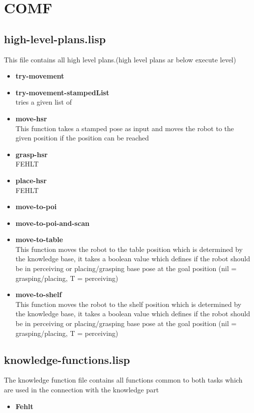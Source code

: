\documentclass[main.tex]{subfiles}
\begin{document}
	  	\section{COMF}
	    \subsection{high-level-plans.lisp}
	    This file contains all high level plans.(high level plans ar below execute level)
	    \begin{itemize}
	    \item \textbf{try-movement} \\
	    
		\item \textbf{try-movement-stampedList} \\
		tries a given list of
	    \item \textbf{move-hsr} \\
	    This function takes a stamped pose as input and moves the robot to the given position if the position can be reached
	    \item \textbf{grasp-hsr} \\
	    FEHLT
	    \item \textbf{place-hsr} \\
	    FEHLT
	    \item \textbf{move-to-poi} \\
	    \item \textbf{move-to-poi-and-scan} \\
	    \item \textbf{move-to-table} \\
	    This function moves the robot to the table position which is determined by the knowledge base, it takes a boolean value which defines if the robot should be in perceiving or placing/grasping base pose at the goal position (nil = grasping/placing, T = perceiving) 
	    \item \textbf{move-to-shelf} \\
	    This function moves the robot to the shelf position which is determined by the knowledge base, it takes a boolean value which defines if the robot should be in perceiving or placing/grasping base pose at the goal position (nil = grasping/placing, T = perceiving) 
		\end{itemize}
	    \subsection{knowledge-functions.lisp}
	    The knowledge function file contains all functions common to both tasks which are used in the connection with the knowledge part
	    \begin{itemize}
	    	\item \textbf{Fehlt} \\
	    \end{itemize}
\end{document}
